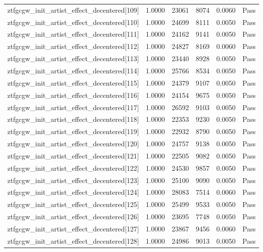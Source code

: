\begin{table}[htbp]
\begin{tabular}{llrrll}
ztfgcgw\_init\_artist\_effect\_decentered[109] & 1.0000 & 23061 & 8074 & 0.0060 & Pass \\
ztfgcgw\_init\_artist\_effect\_decentered[110] & 1.0000 & 24699 & 8111 & 0.0050 & Pass \\
ztfgcgw\_init\_artist\_effect\_decentered[111] & 1.0000 & 24162 & 9141 & 0.0050 & Pass \\
ztfgcgw\_init\_artist\_effect\_decentered[112] & 1.0000 & 24827 & 8169 & 0.0060 & Pass \\
ztfgcgw\_init\_artist\_effect\_decentered[113] & 1.0000 & 23440 & 8928 & 0.0050 & Pass \\
ztfgcgw\_init\_artist\_effect\_decentered[114] & 1.0000 & 25766 & 8534 & 0.0050 & Pass \\
ztfgcgw\_init\_artist\_effect\_decentered[115] & 1.0000 & 24379 & 9107 & 0.0050 & Pass \\
ztfgcgw\_init\_artist\_effect\_decentered[116] & 1.0000 & 24154 & 9675 & 0.0050 & Pass \\
ztfgcgw\_init\_artist\_effect\_decentered[117] & 1.0000 & 26592 & 9103 & 0.0050 & Pass \\
ztfgcgw\_init\_artist\_effect\_decentered[118] & 1.0000 & 22353 & 9230 & 0.0050 & Pass \\
ztfgcgw\_init\_artist\_effect\_decentered[119] & 1.0000 & 22932 & 8790 & 0.0050 & Pass \\
ztfgcgw\_init\_artist\_effect\_decentered[120] & 1.0000 & 24757 & 9138 & 0.0050 & Pass \\
ztfgcgw\_init\_artist\_effect\_decentered[121] & 1.0000 & 22505 & 9082 & 0.0050 & Pass \\
ztfgcgw\_init\_artist\_effect\_decentered[122] & 1.0000 & 24530 & 9857 & 0.0050 & Pass \\
ztfgcgw\_init\_artist\_effect\_decentered[123] & 1.0000 & 25100 & 9090 & 0.0050 & Pass \\
ztfgcgw\_init\_artist\_effect\_decentered[124] & 1.0000 & 28083 & 7514 & 0.0060 & Pass \\
ztfgcgw\_init\_artist\_effect\_decentered[125] & 1.0000 & 25499 & 9533 & 0.0050 & Pass \\
ztfgcgw\_init\_artist\_effect\_decentered[126] & 1.0000 & 23695 & 7748 & 0.0050 & Pass \\
ztfgcgw\_init\_artist\_effect\_decentered[127] & 1.0000 & 23867 & 9456 & 0.0060 & Pass \\
ztfgcgw\_init\_artist\_effect\_decentered[128] & 1.0000 & 24986 & 9013 & 0.0050 & Pass \\

\end{tabular}
\end{table}
